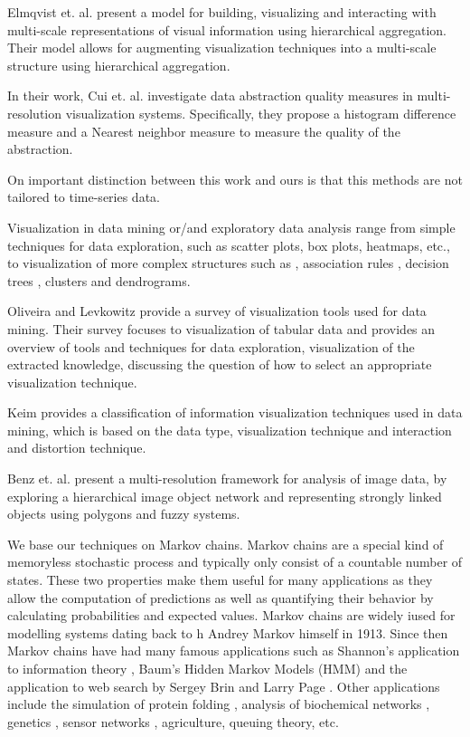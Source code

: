 Elmqvist et. al. \cite{Elmqvist:2010:HAI:1749404.1749525} present a model for building, visualizing and interacting with
multi-scale representations of visual information using hierarchical aggregation. Their model allows for augmenting visualization
techniques into a multi-scale structure using hierarchical aggregation.

In their work, Cui et. al. \cite{4015421} investigate data abstraction quality measures in multi-resolution
visualization systems. Specifically, they propose a histogram difference measure and a Nearest neighbor
measure to measure the quality of the abstraction.

On important distinction between this work and ours is that this methods are not tailored to time-series data.


Visualization in data mining or/and exploratory data analysis range from simple techniques for data exploration, such as
scatter plots, box plots, heatmaps, etc., to visualization of more complex structures such as ,
association rules \cite{Hahsler_visualizingassociation}, decision trees \cite{963292,Nguyen2000}, clusters and dendrograms.

Oliveira and Levkowitz \cite{1207445} provide a survey of visualization tools used for data mining. Their survey focuses
to visualization of tabular data and provides an overview of tools and techniques for data exploration,
visualization of the extracted knowledge, discussing the question of how to select an appropriate visualization
technique.

Keim \cite{981847} provides a classification of information visualization techniques used in data mining, which is based on
the data type, visualization technique and interaction and distortion technique.

Benz et. al. \cite{Benz2004239} present a multi-resolution framework for analysis of image data, by exploring a hierarchical
image object network and representing strongly linked objects using polygons and fuzzy systems.


We base our techniques on  Markov chains. Markov chains are a special kind of memoryless stochastic process and typically only consist of a countable number of states. These two properties make them useful for many applications as they allow the computation of predictions as
well as quantifying their behavior by calculating probabilities and expected values. Markov chains are widely iused for modelling systems dating back to h Andrey Markov himself \cite{markov13} in 1913. Since then
Markov chains have had many famous applications such as Shannon's application to information theory \cite{Shannon:1948},
Baum's Hidden Markov Models (HMM) \cite{baum1970} and the application to web search by Sergey Brin and Larry Page \cite{Lawrence981}.
%
Other applications include the simulation of protein folding \cite{pande-beauchamp-bowman:2010:methods:markov-model-review},
analysis of biochemical networks \cite{Ciocchetta2009145},
genetics \cite{Huelsenbeck2310}, sensor networks \cite{DBLP:journals/corr/AlsheikhHNTL15}, agriculture, queuing theory, etc.

